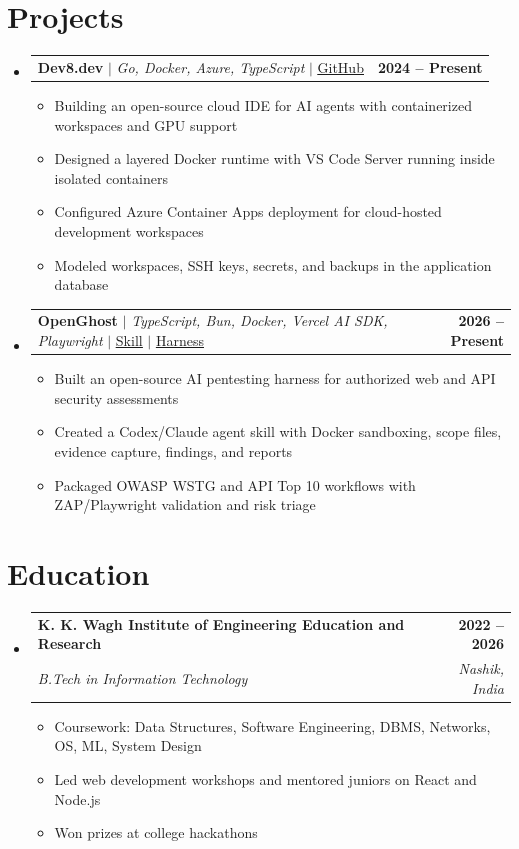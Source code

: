 \documentclass[letterpaper,11pt]{article}
\makeatletter
\newcommand{\resumeItem}[1]{\item\small{{#1 \vspace{-2pt}}}}
\newcommand{\resumeSubheading}[4]{
  \vspace{-2pt}\item
    \begin{tabular*}{1.0\textwidth}[t]{l@{\extracolsep{\fill}}r}
      \textbf{#1} & \textbf{\small #2} \\
      \textit{\small#3} & \textit{\small #4} \\
    \end{tabular*}\vspace{-7pt}
}
\newcommand{\resumeProjectHeading}[2]{
    \item
    \begin{tabular*}{1.001\textwidth}{l@{\extracolsep{\fill}}r}
      \small#1 & \textbf{\small #2}\\
    \end{tabular*}\vspace{-7pt}
}
\newcommand{\resumeSubHeadingListStart}{\begin{itemize}[leftmargin=0.0in, label={}]}
\newcommand{\resumeSubHeadingListEnd}{\end{itemize}}
\newcommand{\resumeItemListStart}{\begin{itemize}}
\newcommand{\resumeItemListEnd}{\end{itemize}\vspace{-5pt}}
\makeatother
\begin{document}
\section{Projects}
    \vspace{-5pt}
    \resumeSubHeadingListStart
      \resumeProjectHeading
          {\textbf{Dev8.dev} $|$ \emph{Go, Docker, Azure, TypeScript} $|$ \href{https://github.com/VAIBHAVSING/Dev8.dev}{\underline{GitHub}}}{2024 -- Present}
          \resumeItemListStart
            \resumeItem{Building an open-source cloud IDE for AI agents with containerized workspaces and GPU support}
            \resumeItem{Designed a layered Docker runtime with VS Code Server running inside isolated containers}
            \resumeItem{Configured Azure Container Apps deployment for cloud-hosted development workspaces}
            \resumeItem{Modeled workspaces, SSH keys, secrets, and backups in the application database}
          \resumeItemListEnd
          \vspace{-13pt}
      \resumeProjectHeading
          {\textbf{OpenGhost} $|$ \emph{TypeScript, Bun, Docker, Vercel AI SDK, Playwright} $|$ \href{https://github.com/VAIBHAVSING/openghost}{\underline{Skill}} $|$ \href{https://github.com/VAIBHAVSING/open-ghost}{\underline{Harness}}}{2026 -- Present}
          \resumeItemListStart
            \resumeItem{Built an open-source AI pentesting harness for authorized web and API security assessments}
            \resumeItem{Created a Codex/Claude agent skill with Docker sandboxing, scope files, evidence capture, findings, and reports}
            \resumeItem{Packaged OWASP WSTG and API Top 10 workflows with ZAP/Playwright validation and risk triage}
          \resumeItemListEnd
    \resumeSubHeadingListEnd
\vspace{-15pt}


\section{Education}
  \resumeSubHeadingListStart
    \resumeSubheading
      {K. K. Wagh Institute of Engineering Education and Research}{2022 -- 2026}
      {B.Tech in Information Technology}{Nashik, India}
      \resumeItemListStart
        \resumeItem{Coursework: Data Structures, Software Engineering, DBMS, Networks, OS, ML, System Design}
        \resumeItem{Led web development workshops and mentored juniors on React and Node.js}
        \resumeItem{Won prizes at college hackathons}
      \resumeItemListEnd
  \resumeSubHeadingListEnd
\end{document}
